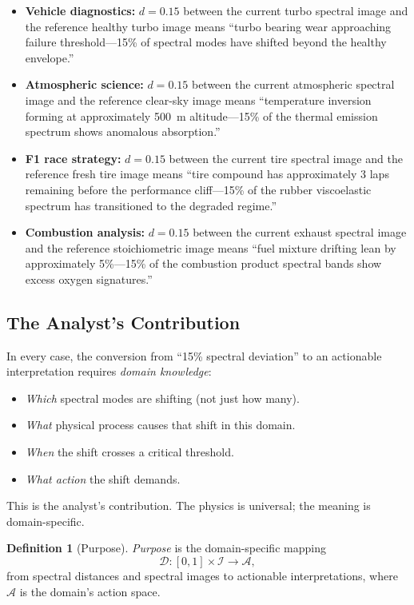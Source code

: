 \documentclass[11pt,twocolumn,a4paper]{article}
\theoremstyle{definition}
\newtheorem{definition}[theorem]{Definition}
\theoremstyle{remark}
\begin{document}
\begin{itemize}
    \item \textbf{Vehicle diagnostics:} $d = 0.15$ between the current turbo spectral image and the reference healthy turbo image means ``turbo bearing wear approaching failure threshold---15\% of spectral modes have shifted beyond the healthy envelope.''

    \item \textbf{Atmospheric science:} $d = 0.15$ between the current atmospheric spectral image and the reference clear-sky image means ``temperature inversion forming at approximately 500~m altitude---15\% of the thermal emission spectrum shows anomalous absorption.''

    \item \textbf{F1 race strategy:} $d = 0.15$ between the current tire spectral image and the reference fresh tire image means ``tire compound has approximately 3 laps remaining before the performance cliff---15\% of the rubber viscoelastic spectrum has transitioned to the degraded regime.''

    \item \textbf{Combustion analysis:} $d = 0.15$ between the current exhaust spectral image and the reference stoichiometric image means ``fuel mixture drifting lean by approximately 5\%---15\% of the combustion product spectral bands show excess oxygen signatures.''
\end{itemize}

\subsection{The Analyst's Contribution}

In every case, the conversion from ``15\% spectral deviation'' to an actionable interpretation requires \emph{domain knowledge}:
\begin{itemize}
    \item \emph{Which} spectral modes are shifting (not just how many).
    \item \emph{What} physical process causes that shift in this domain.
    \item \emph{When} the shift crosses a critical threshold.
    \item \emph{What action} the shift demands.
\end{itemize}

This is the analyst's contribution.  The physics is universal; the meaning is domain-specific.

\begin{definition}[Purpose]\label{def:purpose}
\emph{Purpose} is the domain-specific mapping
\begin{equation}\label{eq:purpose-def}
    \mathcal{D} : [0,1] \times \mathcal{I} \to \mathcal{A},
\end{equation}
from spectral distances and spectral images to actionable interpretations, where $\mathcal{A}$ is the domain's action space.
\end{definition}
\end{document}
